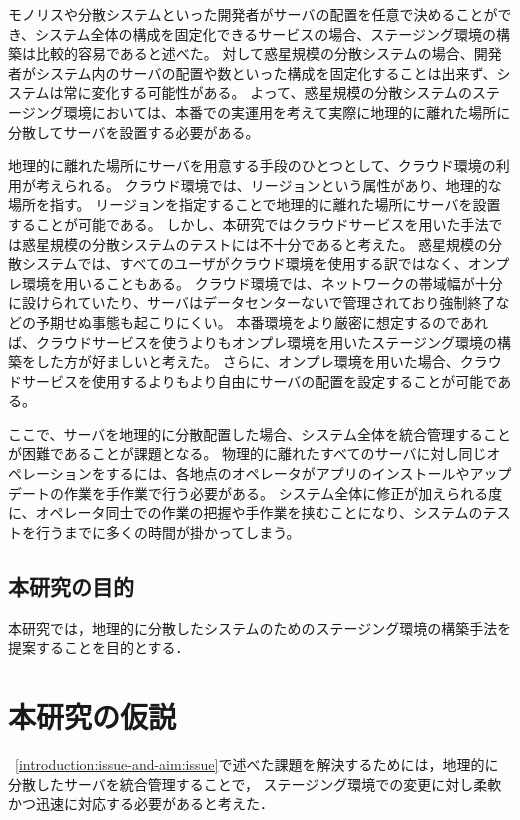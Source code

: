 モノリスや分散システムといった開発者がサーバの配置を任意で決めることができ、システム全体の構成を固定化できるサービスの場合、ステージング環境の構築は比較的容易であると述べた。
対して惑星規模の分散システムの場合、開発者がシステム内のサーバの配置や数といった構成を固定化することは出来ず、システムは常に変化する可能性がある。
よって、惑星規模の分散システムのステージング環境においては、本番での実運用を考えて実際に地理的に離れた場所に分散してサーバを設置する必要がある。

地理的に離れた場所にサーバを用意する手段のひとつとして、クラウド環境の利用が考えられる。
クラウド環境では、リージョンという属性があり、地理的な場所を指す。
リージョンを指定することで地理的に離れた場所にサーバを設置することが可能である。
しかし、本研究ではクラウドサービスを用いた手法では惑星規模の分散システムのテストには不十分であると考えた。
惑星規模の分散システムでは、すべてのユーザがクラウド環境を使用する訳ではなく、オンプレ環境を用いることもある。
クラウド環境では、ネットワークの帯域幅が十分に設けられていたり、サーバはデータセンターないで管理されており強制終了などの予期せぬ事態も起こりにくい。
本番環境をより厳密に想定するのであれば、クラウドサービスを使うよりもオンプレ環境を用いたステージング環境の構築をした方が好ましいと考えた。
さらに、オンプレ環境を用いた場合、クラウドサービスを使用するよりもより自由にサーバの配置を設定することが可能である。

ここで、サーバを地理的に分散配置した場合、システム全体を統合管理することが困難であることが課題となる。
物理的に離れたすべてのサーバに対し同じオペレーションをするには、各地点のオペレータがアプリのインストールやアップデートの作業を手作業で行う必要がある。
システム全体に修正が加えられる度に、オペレータ同士での作業の把握や手作業を挟むことになり、システムのテストを行うまでに多くの時間が掛かってしまう。

\subsection{本研究の目的}
\label{introduction:issue-and-aim:aim}

本研究では，地理的に分散したシステムのためのステージング環境の構築手法を提案することを目的とする．

\section{本研究の仮説}
\label{introduction:hypothesis}

~\ref{introduction:issue-and-aim:issue}で述べた課題を解決するためには，地理的に分散したサーバを統合管理することで，
ステージング環境での変更に対し柔軟かつ迅速に対応する必要があると考えた．

